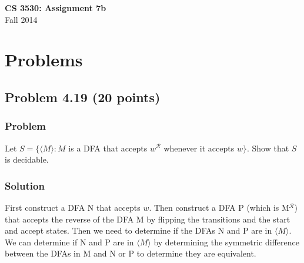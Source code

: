 \documentclass{article}
\begin{document}
\begin{center}
\textbf{\Large CS 3530: Assignment 7b} \\[2mm]
Fall 2014
\end{center}

\raggedright

\section*{Problems}

\subsection*{Problem 4.19 (20 points)}

\subsubsection*{Problem}

Let $S=\{\langle M\rangle: M$ is a DFA that accepts $w^\mathcal{R}$
whenever it accepts $w\}$. Show that $S$ is decidable.

\subsubsection*{Solution}

First construct a DFA N that accepts $w$. 
Then construct a DFA P (which is M$^\mathcal{R}$)
that accepts the reverse of the DFA M by flipping the transitions and 
the start and accept states. Then we need to determine if the DFAs N and P 
are in $\langle M\rangle$. We can determine if N and P are in 
$\langle M\rangle$ by determining the symmetric difference between the DFAs 
in M and N or P to determine they are equivalent.
\end{document}
